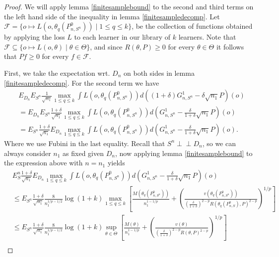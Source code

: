 \documentclass[11pt, a4paper]{article}
\newcommand{\indep}{\perp \!\!\! \perp}
\theoremstyle{definition}
\theoremstyle{remark}
\newcommand{\q}{q}
\newcommand{\ml}{k}
\newcommand{\btheta}{\theta}
\newcommand{\Sn}{S^n}
\begin{document}
\begin{proof}[Proof]
    We will apply lemma \ref{finitesamplebound} to the second and third terms on the left hand side of the inequality in lemma \ref{finitesampledecomp}. Let $ \mathcal{F} = \{o \mapsto L(o, \btheta_{\q}(P_{n,\Sn}^{0})) \mid 1 \leq \q \leq \ml\}$, be the collection of functions obtained by applying the loss $ L $ to each learner in our library of $ \ml $ learners. Note that $ \mathcal{F} \subseteq \{o \mapsto L(o, \btheta) \mid \btheta \in \Theta\} $, and since $ R(\btheta, P) \geq 0 $ for every $ \btheta \in \Theta $ it follows that $ Pf \geq 0 $ for every $ f \in \mathcal{F} $.

First, we take the expectation wrt. $ D_n $ on both sides in lemma \ref{finitesampledecomp}. For the second term we have 
\begin{align*}
&E_{D_n} E_{\Sn} \frac{1}{\sqrt{n_1} } \max_{1 \leq \q \leq k} \int L(o, \btheta_{\q}(P_{n, \Sn}^{0})) d ((1 + \delta) G_{n,\Sn}^{1} - \delta \sqrt{n_1} P)(o)\\
&= 
E_{D_n}E_{\Sn} \frac{1 + \delta}{\sqrt{n_1} } \max_{1 \leq \q \leq k} \int L(o, \btheta_{\q}(P_{n, \Sn}^{0})) d (G_{n,\Sn}^{1} - \frac{\delta }{1 + \delta} \sqrt{n_1} P)(o)\\
&=E_{\Sn} \frac{1 + \delta}{\sqrt{n_1} } E_{D_n}\max_{1 \leq \q \leq k} \int L(o, \btheta_{\q}(P_{n, \Sn}^{0})) d (G_{n,\Sn}^{1} - \frac{\delta }{1 + \delta} \sqrt{n_1} P)(o).
\end{align*}
Where we use Fubini in the last equality. Recall that $ \Sn \indep D_n $, so we can always consider $ n_1 $ as fixed given $ D_n $, now applying lemma \ref{finitesamplebound} to the expression above with $ n = n_1 $ yields 
\begin{align*}
&E_\Sn\frac{1 + \delta}{\sqrt{n_1} } E_{D_n} \max_{1 \leq \q \leq k} \int L(o, \btheta_{\q}(P_{n, \Sn}^{0})) d (G_{n,\Sn}^{1} - \frac{\delta }{1 + \delta} \sqrt{n_1} P)(o) \\
&\leq E_{\Sn} \frac{1 + \delta}{\sqrt{n_1}} \frac{8}{n_1^{1/p-1/2}} \log(1 + k) \max_{1 \leq \q \leq k} \left[ \frac{M(\btheta_{\q}(P_{n,\Sn}^{0}))}{n_1^{1-1/p}} + \left( \frac{v(\btheta_{ \q}(P_{n,\Sn}^0) )}{( \frac{\delta}{1 + \delta} )^{2-p} R(\btheta_{\q}(P_{n,S}^{0}), P)^{2-p}} \right)^{1/p} \right] \\
&\leq E_{\Sn}\frac{1 + \delta}{\sqrt{n_1}} \frac{8}{n_1^{1/p-1/2}} \log(1 + k) \sup_{\btheta \in \Theta} \left[ \frac{M(\btheta)}{n_1^{1-1/p}} + \left( \frac{v(\btheta)}{( \frac{\delta}{1 + \delta} )^{2-p} R(\btheta,P)^{2-p}} \right)^{1/p} \right] \\

\end{align*}
\end{proof}
\end{document}
